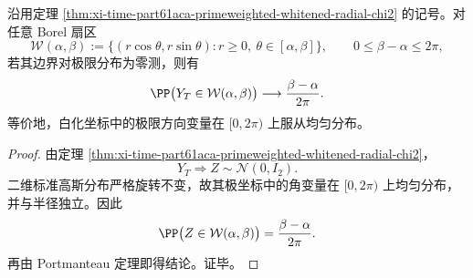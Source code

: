 \begin{corollary}\label{cor:xi-time-part61aca-primeweighted-whitened-sector-uniformity}
沿用定理 \ref{thm:xi-time-part61aca-primeweighted-whitened-radial-chi2} 的记号。对任意 Borel 扇区
\[
\mathcal W(\alpha,\beta)
:=
\{(r\cos\theta,r\sin\theta):r\ge 0,\ \theta\in[\alpha,\beta]\},
\qquad
0\le \beta-\alpha\le 2\pi,
\]
若其边界对极限分布为零测，则有
\[
\PP\bigl(Y_T\in \mathcal W(\alpha,\beta)\bigr)
\longrightarrow
\frac{\beta-\alpha}{2\pi}.
\]
等价地，白化坐标中的极限方向变量在 \([0,2\pi)\) 上服从均匀分布。
\end{corollary}
\begin{proof}
由定理 \ref{thm:xi-time-part61aca-primeweighted-whitened-radial-chi2}，
\[
Y_T\Longrightarrow Z\sim \mathcal N(0,I_2).
\]
二维标准高斯分布严格旋转不变，故其极坐标中的角变量在 \([0,2\pi)\) 上均匀分布，并与半径独立。因此
\[
\PP\bigl(Z\in\mathcal W(\alpha,\beta)\bigr)=\frac{\beta-\alpha}{2\pi}.
\]
再由 Portmanteau 定理即得结论。证毕。
\end{proof}

